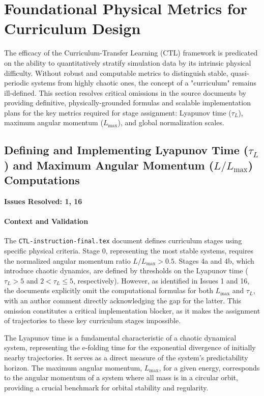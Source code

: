 \section{Foundational Physical Metrics for Curriculum Design}
The efficacy of the Curriculum-Transfer Learning (CTL) framework is predicated on the ability to quantitatively stratify simulation data by its intrinsic physical difficulty. Without robust and computable metrics to distinguish stable, quasi-periodic systems from highly chaotic ones, the concept of a "curriculum" remains ill-defined. This section resolves critical omissions in the source documents by providing definitive, physically-grounded formulas and scalable implementation plans for the key metrics required for stage assignment: Lyapunov time ($\tau_L$), maximum angular momentum ($L_{\max}$), and global normalization scales.

\subsection{Defining and Implementing Lyapunov Time (\texorpdfstring{$\tau_L$}{tau\_L}) and Maximum Angular Momentum (\texorpdfstring{$L/L_{\max}$}{L/L\_max}) Computations}
\textbf{Issues Resolved: 1, 16}
\paragraph{Context and Validation}
The \texttt{CTL-instruction-final.tex} document defines curriculum stages using specific physical criteria. Stage 0, representing the most stable systems, requires the normalized angular momentum ratio $L/L_{\max} > 0.5$. Stages 4a and 4b, which introduce chaotic dynamics, are defined by thresholds on the Lyapunov time ($\tau_L > 5$ and $2 < \tau_L \leq 5$, respectively). However, as identified in Issues 1 and 16, the documents explicitly omit the computational formulas for both $L_{\max}$ and $\tau_L$, with an author comment directly acknowledging the gap for the latter. This omission constitutes a critical implementation blocker, as it makes the assignment of trajectories to these key curriculum stages impossible.

The Lyapunov time is a fundamental characteristic of a chaotic dynamical system, representing the e-folding time for the exponential divergence of initially nearby trajectories. It serves as a direct measure of the system's predictability horizon. The maximum angular momentum, $L_{\max}$, for a given energy, corresponds to the angular momentum of a system where all mass is in a circular orbit, providing a crucial benchmark for orbital stability and regularity.

